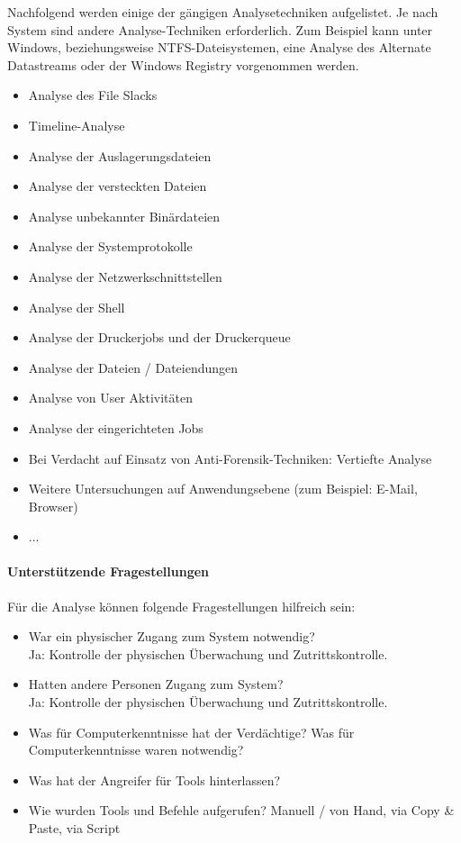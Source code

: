 Nachfolgend werden einige der gängigen Analysetechniken aufgelistet. Je nach System sind andere Analyse-Techniken erforderlich. Zum Beispiel kann unter Windows, beziehungsweise NTFS-Dateisystemen, eine Analyse des Alternate Datastreams oder der Windows Registry vorgenommen werden.

\begin{itemize}
\item Analyse des File Slacks
\item Timeline-Analyse
\item Analyse der Auslagerungsdateien
\item Analyse der versteckten Dateien
\item Analyse unbekannter Binärdateien
\item Analyse der Systemprotokolle
\item Analyse der Netzwerkschnittstellen
\item Analyse der Shell
\item Analyse der Druckerjobs und der Druckerqueue
\item Analyse der Dateien / Dateiendungen
\item Analyse von User Aktivitäten
\item Analyse der eingerichteten Jobs
\item Bei Verdacht auf Einsatz von Anti-Forensik-Techniken: Vertiefte Analyse
\item Weitere Untersuchungen auf Anwendungsebene (zum Beispiel: E-Mail, Browser)
\item ...
\end{itemize}

\paragraph{Unterstützende Fragestellungen}
Für die Analyse können folgende Fragestellungen hilfreich sein:
\begin{itemize}
\item War ein physischer Zugang zum System notwendig?\\
Ja: Kontrolle der physischen Überwachung und Zutrittskontrolle.
\item Hatten andere Personen Zugang zum System?\\
Ja: Kontrolle der physischen Überwachung und Zutrittskontrolle.
\item Was für Computerkenntnisse hat der Verdächtige? Was für Computerkenntnisse waren notwendig?
\item Was hat der Angreifer für Tools hinterlassen?
\item Wie wurden Tools und Befehle aufgerufen? Manuell / von Hand, via Copy \& Paste, via Script
\end{itemize}

